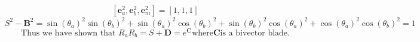 \documentclass[10pt,fleqn]{report}
\newcommand{\T}[1]{\text{#1}}
\begin{document}
\begin{equation} \left [ \bm{e}_{a}^{2},\bm{e}_{b}^{2},\bm{e}_{m}^2\right ] = [1, 1, 1] \nonumber\end{equation}
\begin{equation} S^{2}-\bm{B}^{2} = {\sin{\left (\theta _{a} \right )}}^{2} {\sin{\left (\theta _{b} \right )}}^{2} + {\sin{\left (\theta _{a} \right )}}^{2} {\cos{\left (\theta _{b} \right )}}^{2} + {\sin{\left (\theta _{b} \right )}}^{2} {\cos{\left (\theta _{a} \right )}}^{2} + {\cos{\left (\theta _{a} \right )}}^{2} {\cos{\left (\theta _{b} \right )}}^{2}  = 1 \nonumber\end{equation}
\begin{equation} \T{Thus we have shown that }R_{a}R_{b} = S+\bm{D} = e^{\bm{C}} \T{where} \bm{C} \T{is a bivector blade.} \nonumber\end{equation}
\end{document}
